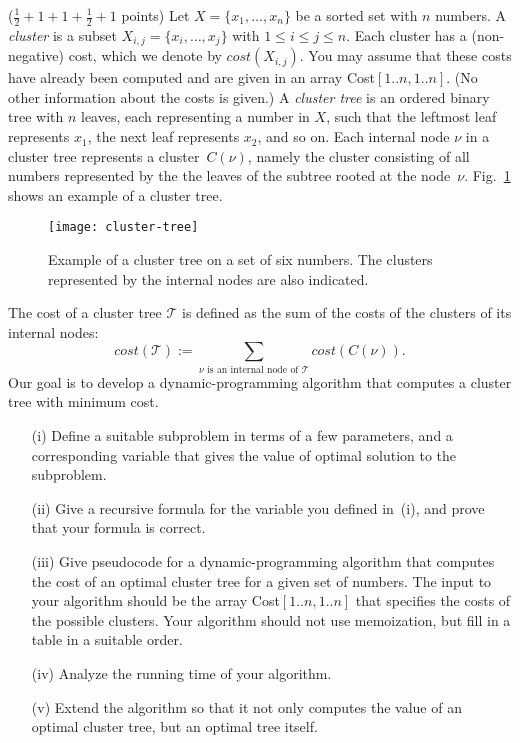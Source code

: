 \documentclass{article}
\newcommand{\tree}{\ensuremath{\mathcal{T}}}
\newcommand{\node}{\nu}
\newcommand{\cost}{\mathit{cost}}
\renewcommand{\leq}{\leqslant}
\newcounter{rcounter}
\newenvironment{rlist}%
{\begin{list}{A.2-\arabic{rcounter}}{\usecounter{rcounter}}}{\end{list}}
\newcounter{rcountermem}
\begin{document}
\begin{rlist}
\item ($\frac{1}{2}+1+1+\frac{1}{2}+1$ points)
      Let $X=\{x_1,\ldots,x_n\}$ be a sorted set with $n$ numbers.
      A \emph{cluster} is a subset $X_{i,j}=\{x_i,\ldots,x_j\}$ with $1\leq i\leq j \leq n$.
      Each cluster has a (non-negative) cost, which we denote by $\cost(X_{i,j})$.
      You may assume that these costs have already been computed and are given in
      an array Cost$[1..n,1..n]$. (No other information about the costs is given.)
      A \emph{cluster tree} is an ordered binary tree with $n$ leaves, each
      representing a number in $X$, such that the leftmost leaf represents $x_1$,
      the next leaf represents $x_2$, and so on. Each internal node $\node$ in a cluster tree
      represents a cluster~$C(\node)$, namely the cluster consisting of all numbers
      represented by the the leaves of the subtree rooted at the node~$\node$.
      Fig.~\ref{fi:cluster-tree} shows an example of a cluster tree.
      \begin{figure}[b]
      \begin{center}
      \texttt{[image: cluster-tree]}
      \end{center}
      \caption{Example of a cluster tree on a set of six numbers.
               The clusters represented by the internal nodes are also indicated.}
      \label{fi:cluster-tree}
      \end{figure}
      The cost of a cluster tree $\tree$ is defined as the sum of the costs of
      the clusters of its internal nodes:
      \[
      \cost(\tree) := \sum_{\mbox{$\node$ is an internal node of $\tree$}} \cost(C(\node)).
      \]
      Our goal is to develop a dynamic-programming algorithm that
      computes a cluster tree with minimum cost.
      \begin{enumerate}
      \item[(i)] Define a suitable subproblem in terms of a few parameters,
                 and a corresponding variable that gives the value of optimal solution to the subproblem.
      \item[(ii)] Give a recursive formula for the variable you defined in~(i),
                  and prove that your formula is correct.
      \item[(iii)] Give pseudocode for a dynamic-programming algorithm that computes
                   the cost of an optimal cluster tree for a given set of numbers.
                   The input to your algorithm should be the array Cost$[1..n,1..n]$
                   that specifies the costs of the possible clusters.
                   Your algorithm should not use memoization, but fill in a table
                   in a suitable order.
      \item[(iv)] Analyze the running time of your algorithm.
      \item[(v)] Extend the algorithm so that it not only computes the value of an optimal
                 cluster tree, but an optimal tree itself.
      \end{enumerate}
\setcounter{rcountermem}{\value{rcounter}}
\end{rlist}
\end{document}

